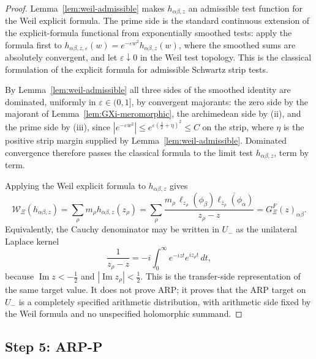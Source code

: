 \documentclass[11pt]{amsart}
\theoremstyle{definition}
\theoremstyle{remark}
\theoremstyle{definition}
\renewcommand{\Im}{\operatorname{Im}}
\newcommand{\half}{\tfrac{1}{2}}
\newcommand{\GXi}{G_\Xi}
\begin{document}
\begin{proof}
Lemma~\ref{lem:weil-admissible} makes $h_{\alpha\beta,z}$ an admissible test function for the Weil
explicit formula.  The prime side is the standard continuous extension of the explicit-formula
functional from exponentially smoothed tests: apply the formula first to
$h_{\alpha\beta,z,\varepsilon}(w)=e^{-\varepsilon w^2}h_{\alpha\beta,z}(w)$, where the smoothed sums are absolutely convergent, and let $\varepsilon\downarrow0$ in
the Weil test topology.  This is the classical formulation of the explicit formula for admissible
Schwartz strip tests.

By Lemma~\ref{lem:weil-admissible} all three sides of the smoothed identity are dominated, uniformly in
$\varepsilon\in(0,1]$, by convergent majorants: the zero side by the majorant of
Lemma~\ref{lem:GXi-meromorphic}, the archimedean side by \textnormal{(ii)}, and the prime side by
\textnormal{(iii)}, since $|e^{-\varepsilon w^2}|\le e^{\varepsilon(\half+\eta)^2}\le C$ on the strip,
where $\eta$ is the positive strip margin supplied by Lemma~\ref{lem:weil-admissible}.
Dominated convergence therefore passes the classical formula \cite{Weil1952} to the limit test
$h_{\alpha\beta,z}$, term by term.

Applying the Weil explicit formula to $h_{\alpha\beta,z}$ gives
\[
   \mathcal W_\Xi(h_{\alpha\beta,z})
   =
   \sum_\rho m_\rho h_{\alpha\beta,z}(z_\rho)
   =
   \sum_\rho
   \frac{
      m_\rho\,\ell_{z_\rho}(\phi_\beta)\overline{\ell_{\bar z_\rho}(\phi_\alpha)}
   }{z_\rho-z}
   =
   \GXi^F(z)_{\alpha\beta}.
\]
Equivalently, the Cauchy denominator may be written in $U_-$ as the unilateral Laplace kernel
\[
   \frac1{z_\rho-z}
   =
   -i\int_0^\infty e^{-izt}e^{iz_\rho t}\,dt,
\]
because $\Im z<-\half$ and $|\Im z_\rho|<\half$.  This is the transfer-side representation of the same target value.  It does
not prove ARP; it proves that the ARP target on $U_-$ is a completely specified arithmetic distribution,
with arithmetic side fixed by the Weil formula and no unspecified holomorphic summand.
\end{proof}

\subsection{Step 5: ARP-P}
\end{document}

